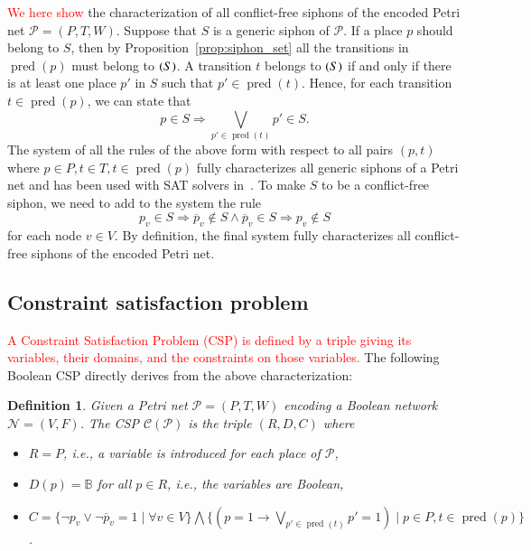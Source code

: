 \documentclass[preprint,12pt]{elsarticle}
\newtheorem{definition}{Definition}[section]
\newcommand{\change}[1]{\textcolor{red}{#1}}
\DeclareMathOperator{\pred}{pred}
\let\succ\relax
\DeclareMathOperator{\succ}{succ}
\begin{document}
\change{We here show} the characterization of all conflict-free siphons of the encoded Petri net \(\mathcal{P} = (P, T, W)\).
Suppose that \(S\) is a generic siphon of \(\mathcal{P}\). If a place \(p\) should belong to \(S\), then by Proposition~\ref{prop:siphon_set} all the transitions in \(\pred(p)\) must belong to \(\succ(S)\).
A transition \(t\) belongs to \(\succ(S)\) if and only if there is at least one place \(p'\) in \(S\) such that \(p' \in \pred(t)\).
Hence, for each transition \(t \in \pred(p)\), we can state that
\begin{equation}
\label{eq:siphon}
p \in S \Rightarrow \bigvee_{p' \in \pred(t)}p' \in S.
\end{equation}
The system of all the rules of the above form with respect to all pairs \((p, t)\) where \(p \in P, t \in T, t \in \pred(p)\) fully characterizes all generic siphons of a Petri net and has been used with SAT solvers in~\cite{oanea2010new,nabli2016enumerating}.
To make \(S\) to be a conflict-free siphon, we need to add to the system the rule
\begin{equation}
\label{eq:conflict}
p_v \in S \Rightarrow \overline{p}_v \not \in S \wedge \overline{p}_v \in S \Rightarrow p_v \not \in S
\end{equation}for each node \(v \in V\).
By definition, the final system fully characterizes all conflict-free siphons of the encoded Petri net.

\subsection{Constraint satisfaction problem}%
\label{subsec:computation_csp}

\change{A Constraint Satisfaction Problem (CSP) is defined by a triple giving its variables, their domains, and the constraints on those variables.}
The following Boolean CSP directly derives from the above characterization:
\begin{definition}

  Given a Petri net \(\mathcal{P} = (P, T, W)\) encoding a Boolean network \(\mathcal{N} = (V, F)\).
  The CSP \(\mathcal{C}(\mathcal{P})\) is the triple \((R, D, C)\) where
  \begin{itemize}%
    \item \(R = P\), i.e., a variable is introduced for each place of \(\mathcal{P}\),
    \item \(D(p) = \mathbb{B}\) for all \(p \in R\), i.e., the variables are Boolean,
    \item \(C = \{\neg p_v \vee \neg \overline{p}_v = 1 \mid \forall v \in V\} \bigwedge
\{(p = 1 \rightarrow \bigvee_{p' \in \pred(t)}p' = 1) \mid p \in P, t \in \pred(p)\}\).
  \end{itemize}

\end{definition}
\end{document}
